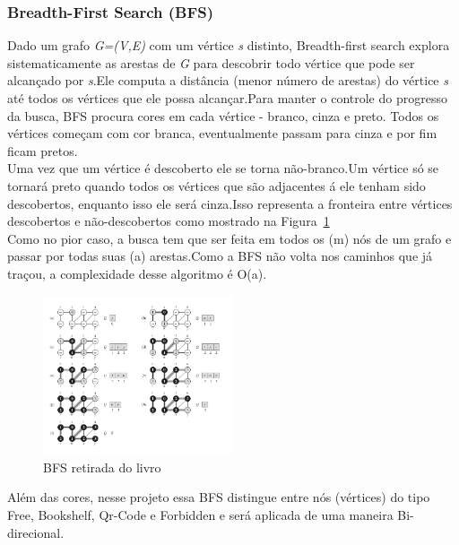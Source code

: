 \documentclass[a4paper,10pt]{article}
\begin{document}
      
      \subsubsection{Breadth-First Search (BFS)}
      Dado um grafo \textit{G=(V,E)} com um vértice \textit{s} distinto, Breadth-first search explora sistematicamente
      as arestas de \textit{G} para descobrir todo vértice que pode ser alcançado por \textit{s}.Ele computa a distância
      (menor número de arestas) do vértice \textit{s} até todos os vértices que ele possa alcançar.Para manter o controle do progresso da busca, BFS procura cores em cada vértice - branco, cinza e preto. Todos os 
      vértices começam com cor branca, eventualmente passam para cinza e por fim  ficam pretos.\cite{bfs}\\
      
      Uma vez que um vértice é descoberto ele se torna não-branco.Um vértice só se tornará preto quando todos os vértices
      que são adjacentes á ele tenham sido descobertos, enquanto isso ele será cinza.Isso representa a fronteira entre
      vértices descobertos e não-descobertos como mostrado na Figura~\ref{./imgs/bfs.png}\\
	
	Como no pior caso, a busca tem que ser feita em todos os (m) nós de um grafo e passar por todas suas (a) arestas.Como a 
      BFS não volta nos caminhos que já traçou, a complexidade desse algoritmo é O(a).\\	 
      \begin{figure}[H]
	\centering
      	\includegraphics[width=0.50\textwidth]{./imgs/bfs.png}
	\caption{BFS retirada do livro \cite{bfs}}
	\label{./imgs/bfs.png}
      \end{figure}
      Além das cores, nesse projeto essa BFS distingue entre nós (vértices) do tipo Free, Bookshelf, Qr-Code e Forbidden e será 
      aplicada de uma maneira Bi-direcional.\\
      
\end{document}
